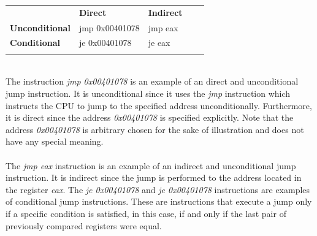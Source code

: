 \documentclass{kththesis}
\begin{document}
\begin{table}[ht]
\centering
\begin{tabular}{lllll}
\cline{1-3}
\multicolumn{1}{|l|}{\textbf{}}              & \multicolumn{1}{l|}{\textbf{Direct}} & \multicolumn{1}{l|}{\textbf{Indirect}} &  &  \\ \cline{1-3}
\multicolumn{1}{|l|}{\textbf{Unconditional}} & \multicolumn{1}{l|}{jmp 0x00401078}    & \multicolumn{1}{l|}{jmp eax}           &  &  \\ \cline{1-3}
\multicolumn{1}{|l|}{\textbf{Conditional}}   & \multicolumn{1}{l|}{je 0x00401078}     & \multicolumn{1}{l|}{je eax}            &  &  \\ \cline{1-3}
                                             &                                      &                                        &  &
\end{tabular}
\label{tab:jumps}
\end{table}
\noindent
\\
The instruction \textit{jmp 0x00401078} is an example of an direct and unconditional jump instruction. It is unconditional since it uses the \textit{jmp} instruction which instructs the CPU to jump to the specified address unconditionally. Furthermore, it is direct since the address \textit{0x00401078} is specified explicitly. Note that the address \textit{0x00401078} is arbitrary chosen for the sake of illustration and does not have any special meaning.
\\ \\
The \textit{jmp eax} instruction is an example of an indirect and unconditional jump instruction. It is indirect since the jump is performed to the address located in the register \textit{eax}. The \textit{je 0x00401078} and \textit{je 0x00401078} instructions are examples of conditional jump instructions. These are instructions that execute a jump only if a specific condition is satisfied, in this case, if and only if the last pair of previously compared registers were equal. 
\\ \\
\end{document}
